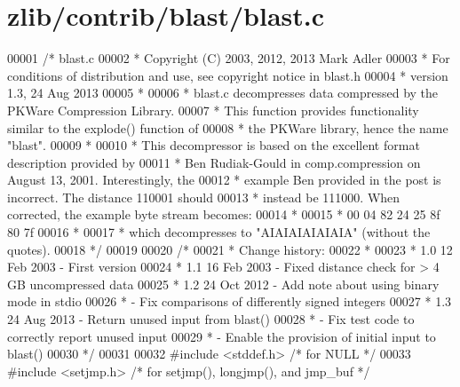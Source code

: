 \hypertarget{zlib_2contrib_2blast_2blast_8c_source}{}\section{zlib/contrib/blast/blast.c}
\label{zlib_2contrib_2blast_2blast_8c_source}

\begin{DoxyCode}
00001 \textcolor{comment}{/* blast.c}
00002 \textcolor{comment}{ * Copyright (C) 2003, 2012, 2013 Mark Adler}
00003 \textcolor{comment}{ * For conditions of distribution and use, see copyright notice in blast.h}
00004 \textcolor{comment}{ * version 1.3, 24 Aug 2013}
00005 \textcolor{comment}{ *}
00006 \textcolor{comment}{ * blast.c decompresses data compressed by the PKWare Compression Library.}
00007 \textcolor{comment}{ * This function provides functionality similar to the explode() function of}
00008 \textcolor{comment}{ * the PKWare library, hence the name "blast".}
00009 \textcolor{comment}{ *}
00010 \textcolor{comment}{ * This decompressor is based on the excellent format description provided by}
00011 \textcolor{comment}{ * Ben Rudiak-Gould in comp.compression on August 13, 2001.  Interestingly, the}
00012 \textcolor{comment}{ * example Ben provided in the post is incorrect.  The distance 110001 should}
00013 \textcolor{comment}{ * instead be 111000.  When corrected, the example byte stream becomes:}
00014 \textcolor{comment}{ *}
00015 \textcolor{comment}{ *    00 04 82 24 25 8f 80 7f}
00016 \textcolor{comment}{ *}
00017 \textcolor{comment}{ * which decompresses to "AIAIAIAIAIAIA" (without the quotes).}
00018 \textcolor{comment}{ */}
00019 
00020 \textcolor{comment}{/*}
00021 \textcolor{comment}{ * Change history:}
00022 \textcolor{comment}{ *}
00023 \textcolor{comment}{ * 1.0  12 Feb 2003     - First version}
00024 \textcolor{comment}{ * 1.1  16 Feb 2003     - Fixed distance check for > 4 GB uncompressed data}
00025 \textcolor{comment}{ * 1.2  24 Oct 2012     - Add note about using binary mode in stdio}
00026 \textcolor{comment}{ *                      - Fix comparisons of differently signed integers}
00027 \textcolor{comment}{ * 1.3  24 Aug 2013     - Return unused input from blast()}
00028 \textcolor{comment}{ *                      - Fix test code to correctly report unused input}
00029 \textcolor{comment}{ *                      - Enable the provision of initial input to blast()}
00030 \textcolor{comment}{ */}
00031 
00032 \textcolor{preprocessor}{#include <stddef.h>}             \textcolor{comment}{/* for NULL */}
00033 \textcolor{preprocessor}{#include <setjmp.h>}             \textcolor{comment}{/* for setjmp(), longjmp(), and jmp\_buf */}

\end{DoxyCode}
